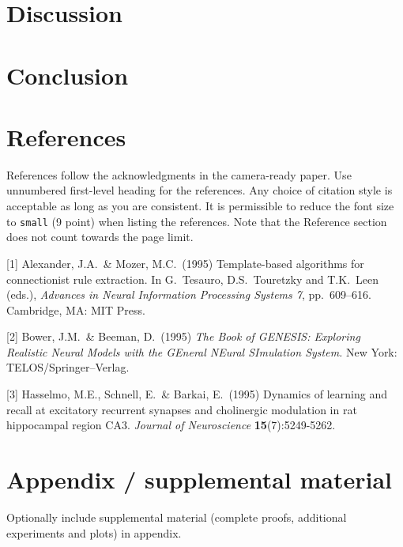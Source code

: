 \documentclass{article}
\begin{document}
\section{Discussion}

\section{Conclusion}



\section*{References}


References follow the acknowledgments in the camera-ready paper. Use unnumbered first-level heading for
the references. Any choice of citation style is acceptable as long as you are
consistent. It is permissible to reduce the font size to \verb+small+ (9 point)
when listing the references.
Note that the Reference section does not count towards the page limit.
\medskip


{
\small


[1] Alexander, J.A.\ \& Mozer, M.C.\ (1995) Template-based algorithms for
connectionist rule extraction. In G.\ Tesauro, D.S.\ Touretzky and T.K.\ Leen
(eds.), {\it Advances in Neural Information Processing Systems 7},
pp.\ 609--616. Cambridge, MA: MIT Press.


[2] Bower, J.M.\ \& Beeman, D.\ (1995) {\it The Book of GENESIS: Exploring
  Realistic Neural Models with the GEneral NEural SImulation System.}  New York:
TELOS/Springer--Verlag.


[3] Hasselmo, M.E., Schnell, E.\ \& Barkai, E.\ (1995) Dynamics of learning and
recall at excitatory recurrent synapses and cholinergic modulation in rat
hippocampal region CA3. {\it Journal of Neuroscience} {\bf 15}(7):5249-5262.
}


\appendix

\section{Appendix / supplemental material}


Optionally include supplemental material (complete proofs, additional experiments and plots) in appendix.
\end{document}
